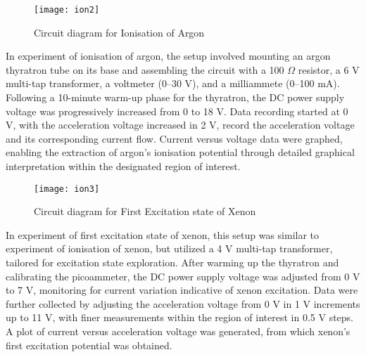 \documentclass[a4paper,11pt]{article}
\begin{document}
\begin{figure}[htbp]
\centering
\texttt{[image: ion2]}
\caption{Circuit diagram for Ionisation of Argon}
\label{5}
\end{figure}
In experiment of ionisation of argon, the setup involved mounting an argon thyratron tube on its base and assembling the circuit with a 100 $\Omega$ resistor, a 6 V multi-tap transformer, a voltmeter (0--30 V), and a milliammete (0--100 mA). Following a 10-minute warm-up phase for the thyratron, the DC power supply voltage was progressively increased from 0 to 18 V. Data recording started at 0 V, with the acceleration voltage increased in 2 V, record the acceleration voltage and its corresponding current flow. Current versus voltage data were graphed, enabling the extraction of argon's ionisation potential through detailed graphical interpretation within the designated region of interest.\\

\begin{figure}[htbp]
\centering
\texttt{[image: ion3]}
\caption{Circuit diagram for First Excitation state of Xenon}
\label{4}
\end{figure}

In experiment of first excitation state of xenon, this setup was similar to experiment of ionisation of xenon, but utilized a 4 V multi-tap transformer, tailored for excitation state exploration. After warming up the thyratron and calibrating the picoammeter, the DC power supply voltage was adjusted from 0 V to 7 V, monitoring for current variation indicative of xenon excitation. Data were further collected by adjusting the acceleration voltage from 0 V in 1 V increments up to 11 V, with finer measurements within the region of interest in 0.5 V steps. A plot of current versus acceleration voltage was generated, from which xenon's first excitation potential was obtained.

\newpage

\end{document}
